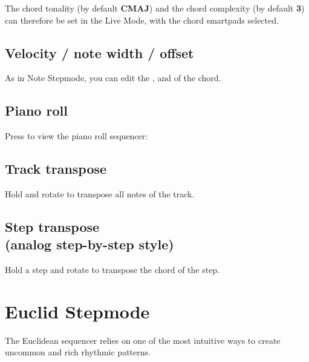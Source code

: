 The chord tonality (by default \textbf{CMAJ}) and the chord complexity (by default \textbf{3}) can therefore be set in the Live Mode, with the chord smartpads selected.


\subsection{Velocity / note width / offset}
As in Note Stepmode, you can edit the ,  and  of the chord.

\subsection{Piano roll}

Press  to view the piano roll sequencer:



\subsection{Track transpose}

Hold  and rotate \encodericon{} to transpose all notes of the track.

\subsection{Step transpose\\(analog step-by-step style)}

Hold a step \padsicon{} and rotate \encodericon{} to transpose the chord of the step.


\section{Euclid Stepmode}

The Euclidean sequencer relies on one of the most intuitive ways to create uncommon and rich rhythmic patterns.

